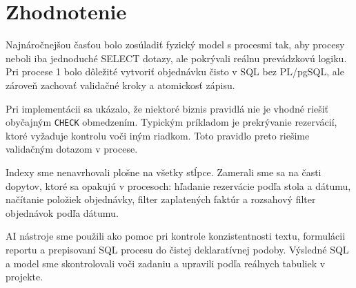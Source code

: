 \documentclass[11pt, a4paper]{article}
\begin{document}
\clearpage
\section{Zhodnotenie}

Najnáročnejšou časťou bolo zosúladiť fyzický model s procesmi tak, aby procesy neboli iba
jednoduché SELECT dotazy, ale pokrývali reálnu prevádzkovú logiku. Pri procese 1 bolo dôležité
vytvoriť objednávku čisto v SQL bez PL/pgSQL, ale zároveň zachovať validačné kroky a atomickosť
zápisu.

Pri implementácii sa ukázalo, že niektoré biznis pravidlá nie je vhodné riešiť obyčajným
\texttt{CHECK} obmedzením. Typickým príkladom je prekrývanie rezervácií, ktoré vyžaduje kontrolu
voči iným riadkom. Toto pravidlo preto riešime validačným dotazom v procese.

Indexy sme nenavrhovali plošne na všetky stĺpce. Zamerali sme sa na časti dopytov, ktoré sa opakujú
v procesoch: hľadanie rezervácie podľa stola a dátumu, načítanie položiek objednávky, filter
zaplatených faktúr a rozsahový filter objednávok podľa dátumu.

AI nástroje sme použili ako pomoc pri kontrole konzistentnosti textu, formulácii reportu a
prepisovaní SQL procesu do čistej deklaratívnej podoby. Výsledné SQL a model sme skontrolovali
voči zadaniu a upravili podľa reálnych tabuliek v projekte.
\end{document}
